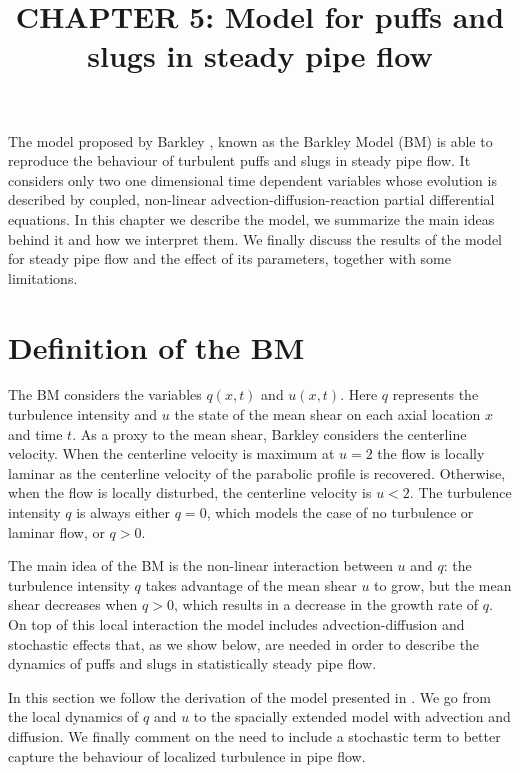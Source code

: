 \documentclass{article}
\title{CHAPTER 5: Model for puffs and slugs in steady pipe flow}
\date{}
\begin{document}
\maketitle
The model proposed by Barkley \cite{barkley2011modeling}, known as the Barkley Model (BM) is able to reproduce the behaviour of turbulent puffs and slugs in steady pipe flow. It considers only two one dimensional time dependent variables whose evolution is described by coupled, non-linear advection-diffusion-reaction partial differential equations. In this chapter we describe the model, we summarize the main ideas behind it and how we interpret them. We finally discuss the results of the model for steady pipe flow and the effect of its parameters, together with some limitations. 


\section{Definition of the BM}
The BM considers the variables $q\left(x,t\right)$ and $u\left(x,t\right)$. Here $q$ represents the turbulence intensity and $u$ the state of the mean shear on each axial location $x$ and time $t$. As a proxy to the mean shear, Barkley considers the centerline velocity. When the centerline velocity is maximum at $u=2$ the flow is locally laminar as the centerline velocity of the parabolic profile is recovered. Otherwise, when the flow is locally disturbed, the centerline velocity is $u < 2$. The turbulence intensity $q$ is always either $q=0$, which models the case of no turbulence or laminar flow, or $q>0$.

The main idea of the BM is the non-linear interaction between $u$ and $q$: the turbulence intensity $q$ takes advantage of the mean shear $u$ to grow, but the mean shear decreases when $q>0$, which results in a decrease in the growth rate of $q$. On top of this local interaction the model includes advection-diffusion and stochastic effects that, as we show below, are needed in order to describe the dynamics of puffs and slugs in statistically steady pipe flow. 

In this section we follow the derivation of the model presented in \cite{barkley2016}. We go from the local dynamics of $q$ and $u$ to the spacially extended model with advection and diffusion. We finally comment on the need to include a stochastic term to better capture the behaviour of localized turbulence in pipe flow.
\end{document}
